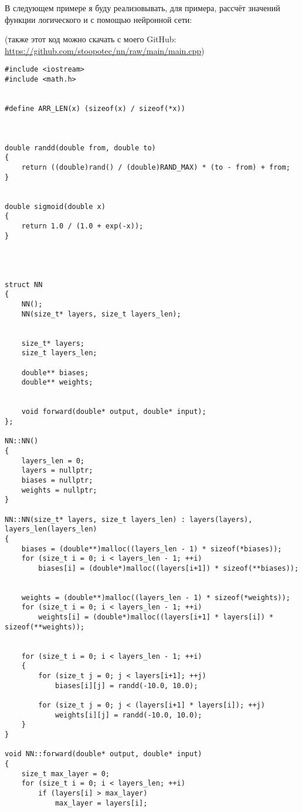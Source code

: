 \documentclass{article}
\begin{document}
        В следующем примере я буду реализовывать, для примера, рассчёт
        значений функции логического и с помощью нейронной сети:

        (также этот код можно скачать с моего GitHub: \url{https://github.com/stoopotec/nn/raw/main/main.cpp})

        

        \lstset{language=C}
        \begin{lstlisting}
#include <iostream>
#include <math.h>


#define ARR_LEN(x) (sizeof(x) / sizeof(*x))



double randd(double from, double to)
{
    return ((double)rand() / (double)RAND_MAX) * (to - from) + from;
}


double sigmoid(double x)
{
    return 1.0 / (1.0 + exp(-x));
}




struct NN
{
    NN();
    NN(size_t* layers, size_t layers_len);


    size_t* layers;
    size_t layers_len;

    double** biases;
    double** weights;


    void forward(double* output, double* input);
};

NN::NN()
{
    layers_len = 0;
    layers = nullptr;
    biases = nullptr;
    weights = nullptr;
}

NN::NN(size_t* layers, size_t layers_len) : layers(layers), layers_len(layers_len)
{
    biases = (double**)malloc((layers_len - 1) * sizeof(*biases));
    for (size_t i = 0; i < layers_len - 1; ++i)
        biases[i] = (double*)malloc((layers[i+1]) * sizeof(**biases));


    weights = (double**)malloc((layers_len - 1) * sizeof(*weights));
    for (size_t i = 0; i < layers_len - 1; ++i)
        weights[i] = (double*)malloc((layers[i+1] * layers[i]) * sizeof(**weights));


    for (size_t i = 0; i < layers_len - 1; ++i)
    {
        for (size_t j = 0; j < layers[i+1]; ++j)
            biases[i][j] = randd(-10.0, 10.0);

        for (size_t j = 0; j < (layers[i+1] * layers[i]); ++j)
            weights[i][j] = randd(-10.0, 10.0);
    }
}

void NN::forward(double* output, double* input)
{
    size_t max_layer = 0;
    for (size_t i = 0; i < layers_len; ++i) 
        if (layers[i] > max_layer)
            max_layer = layers[i];
    

\end{lstlisting}
\end{document}
